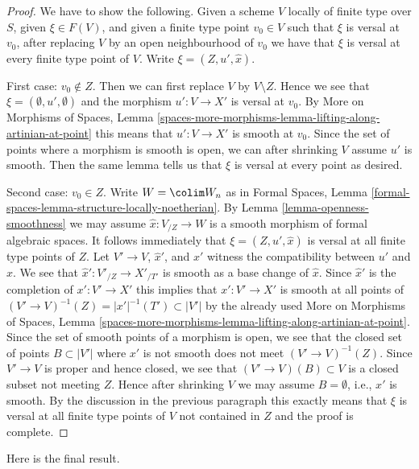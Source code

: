 \begin{proof}
We have to show the following. Given a scheme $V$ locally of finite type over
$S$, given $\xi \in F(V)$, and given a finite type point $v_0 \in V$ such that
$\xi$ is versal at $v_0$, after replacing $V$ by an open neighbourhood
of $v_0$ we have that $\xi$ is versal at every finite type point of $V$.
Write $\xi = (Z, u', \hat x)$.

\medskip\noindent
First case: $v_0 \not \in Z$. Then we can first replace $V$ by
$V \setminus Z$. Hence we see that $\xi = (\emptyset, u', \emptyset)$
and the morphism $u' : V \to X'$ is versal at $v_0$.
By More on Morphisms of Spaces, Lemma
\ref{spaces-more-morphisms-lemma-lifting-along-artinian-at-point}
this means that $u' : V \to X'$ is smooth at $v_0$.
Since the set of points where a morphism is smooth is open,
we can after shrinking $V$ assume $u'$ is smooth.
Then the same lemma tells us that $\xi$ is versal at every
point as desired.

\medskip\noindent
Second case: $v_0 \in Z$. Write $W = \colim W_n$ as in
Formal Spaces, Lemma \ref{formal-spaces-lemma-structure-locally-noetherian}.
By Lemma \ref{lemma-openness-smoothness} we may assume $\hat x : V_{/Z} \to W$
is a smooth morphism of formal algebraic spaces. It follows immediately
that $\xi = (Z, u', \hat x)$ is versal at all finite type points of $Z$.
Let $V' \to V$, $\hat x'$, and $x'$ witness the compatibility between $u'$
and $\hat x$. We see that $\hat x' : V'_{/Z} \to X'_{/T'}$ is smooth as a
base change of $\hat x$. Since $\hat x'$ is the completion of
$x' : V' \to X'$ this implies that $x' : V' \to X'$ is smooth at all
points of $(V' \to V)^{-1}(Z) = |x'|^{-1}(T') \subset |V'|$
by the already used More on Morphisms of Spaces, Lemma
\ref{spaces-more-morphisms-lemma-lifting-along-artinian-at-point}.
Since the set of smooth points of a morphism is open, we see that
the closed set of points $B \subset |V'|$ where $x'$ is not smooth
does not meet $(V' \to V)^{-1}(Z)$. Since $V' \to V$ is proper and
hence closed, we see that $(V' \to V)(B) \subset V$ is a closed
subset not meeting $Z$. Hence after shrinking $V$ we may assume
$B = \emptyset$, i.e., $x'$ is smooth. By the discussion in the previous
paragraph this exactly means that $\xi$ is versal at all finite type
points of $V$ not contained in $Z$ and the proof is complete.
\end{proof}

\noindent
Here is the final result.


